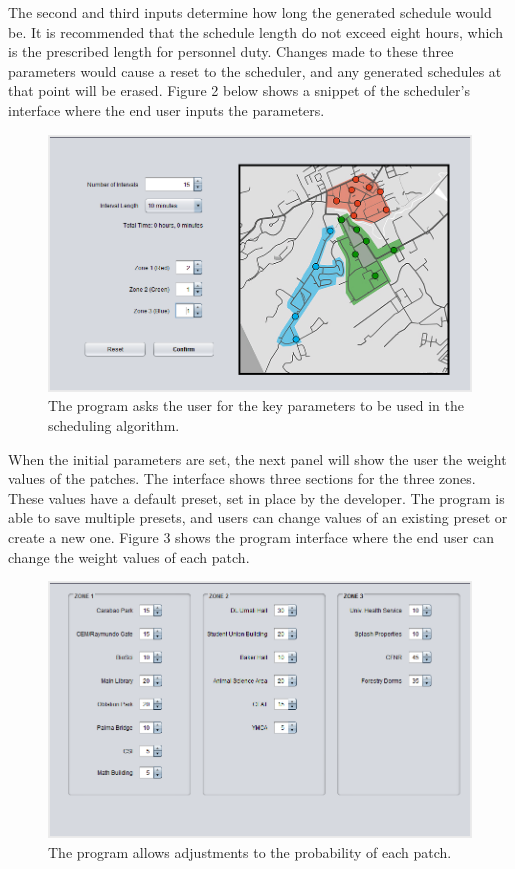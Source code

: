 \documentclass[journal]{./IEEE/IEEEtran}
\begin{document}
The second and third inputs determine how long the generated schedule would be. It is recommended that the schedule length do not exceed eight hours, which is the prescribed length for personnel duty. Changes made to these three parameters would cause a reset to the scheduler, and any generated schedules at that point will be erased. Figure 2 below shows a snippet of the scheduler's interface where the end user inputs the parameters.

\begin{figure}[h]
\centering
\includegraphics[scale=0.3]{./Images/parametersPanel.png}
\caption{The program asks the user for the key parameters to be used in the scheduling algorithm.}
\end{figure}

When the initial parameters are set, the next panel will show the user the weight values of the patches. The interface shows three sections for the three zones. These values have a default preset, set in place by the developer. The program is able to save multiple presets, and users can change values of an existing preset or create a new one. Figure 3 shows the program interface where the end user can change the weight values of each patch.

\begin{figure}[h]
\centering
\includegraphics[scale=0.3]{./Images/weightsPanel.png}
\caption{The program allows adjustments to the probability of each patch.}
\end{figure}
\end{document}
